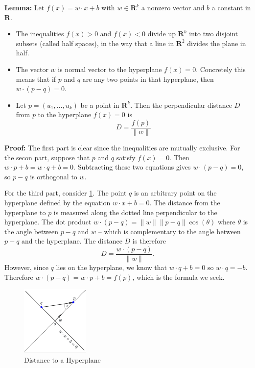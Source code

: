 \documentclass[
  oneside]{scrbook}
\providecommand{\tightlist}{%
  \setlength{\itemsep}{0pt}\setlength{\parskip}{0pt}}
\begin{document}
\textbf{Lemma:} Let \(f(x)=w\cdot x+b\) with \(w\in\mathbf{R}^{k}\) a
nonzero vector and \(b\) a constant in \(\mathbf{R}\).

\begin{itemize}
\tightlist
\item
  The inequalities \(f(x)>0\) and \(f(x)<0\) divide up
  \(\mathbf{R}^{k}\) into two disjoint subsets (called half spaces), in
  the way that a line in \(\mathbf{R}^{2}\) divides the plane in half.
\item
  The vector \(w\) is normal vector to the hyperplane \(f(x)=0\).
  Concretely this means that if \(p\) and \(q\) are any two points in
  that hyperplane, then \(w\cdot (p-q)=0\).
\item
  Let \(p=(u_1,\ldots,u_k)\) be a point in \(\mathbf{R}^{k}\). Then the
  perpendicular distance \(D\) from \(p\) to the hyperplane \(f(x)=0\)
  is \[
  D = \frac{f(p)}{\|w\|}
  \]
\end{itemize}

\textbf{Proof:} The first part is clear since the inequalities are
mutually exclusive. For the secon part, suppose that \(p\) and \(q\)
satisfy \(f(x)=0\). Then \(w\cdot p+b = w\cdot q+b=0\). Subtracting
these two equations gives \(w\cdot (p-q)=0\), so \(p-q\) is orthogonal
to \(w\).

For the third part, consider \cref{fig:triangle}. The point \(q\) is an
arbitrary point on the hyperplane defined by the equation
\(w\cdot x+b=0\). The distance from the hyperplane to \(p\) is measured
along the dotted line perpendicular to the hyperplane. The dot product
\(w\cdot (p-q) = \|w\|\|p-q\|\cos(\theta)\) where \(\theta\) is the
angle between \(p-q\) and \(w\) -- which is complementary to the angle
between \(p-q\) and the hyperplane. The distance \(D\) is therefore \[
D=\frac{w\cdot(p-q)}{\|w\|}.
\] However, since \(q\) lies on the hyperplane, we know that
\(w\cdot q+b=0\) so \(w\cdot q = -b\). Therefore
\(w\cdot(p-q)=w\cdot p+b=f(p)\), which is the formula we seek.

\begin{figure}
\hypertarget{fig:triangle}{%
\centering
\includegraphics[width=0.3\textwidth,height=\textheight]{img/triangle.png}
\caption{Distance to a Hyperplane}\label{fig:triangle}
}
\end{figure}
\end{document}

